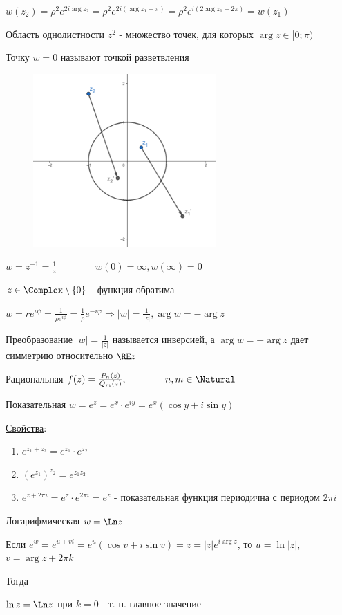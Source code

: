 $w(z_2) = \rho^2 e^{2i\arg z_2} = \rho^2 e^{2i (\arg z_1 + \pi)} = \rho^2 e^{i (2\arg z_1 + 2\pi)} = w(z_1)$

Область однолистности $z^2$ - множество точек, для которых $\arg z \in [0; \pi)$

Точку $w = 0$ называют точкой разветвления


\begin{figure}
    \includegraphics[width=7cm]{addchapters2/images/addchapters2_2025_02_21_1}
\end{figure}

\Exs $w = z^{-1} = \frac{1}{z} \qquad\qquad w(0) = \infty, w(\infty) = 0$

$z \in \Complex \setminus \{0\}$ - функция обратима

$w = re^{i\psi} = \frac{1}{\rho e^{i\phi}} = \frac{1}{\rho} e^{-i\varphi} \Longrightarrow |w| = \frac{1}{|z|}, \arg w = -\arg z$

Преобразование $|w| = \frac{1}{|z|}$ называется инверсией, а $\arg w = -\arg z$ дает симметрию относительно $\RE z$

 Рациональная $f(z) = \frac{P_n(z)}{Q_m(z)}, \qquad\qquad n, m \in \Natural$

 Показательная $w = e^z = e^x \cdot e^{iy} = e^x (\cos y + i \sin y)$

\underline{Свойства}: 

\begin{enumerate}
    \item $e^{z_1 + z_2} = e^{z_1} \cdot e^{z_2}$
    \item $\left(e^{z_1}\right)^{z_2} = e^{z_1 z_2}$
    \item $e^{z + 2\pi i} = e^{z} \cdot e^{2\pi i} = e^z$ - показательная функция периодична с периодом $2\pi i$
\end{enumerate}

 Логарифмическая $w = \Ln z$

Если $e^w = e^{u + vi} = e^u (\cos v + i \sin v) = z = |z| e^{i\arg z}$, то $u = \ln |z|$, $v = \arg z + 2\pi k$

Тогда 

$\ln z = \Ln z$ при $k = 0$ - т. н. главное значение



